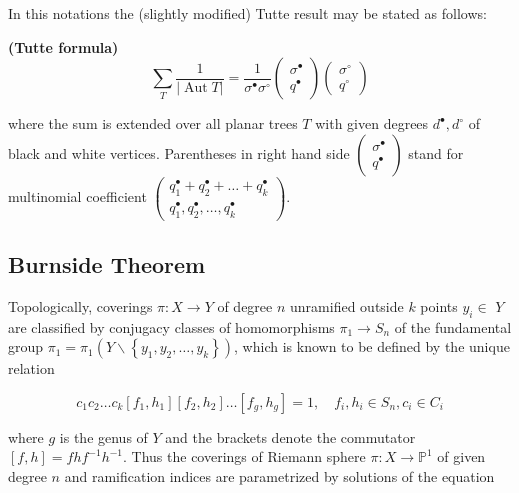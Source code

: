 In this notations the (slightly modified) Tutte result may be stated as follows:

\begin{thm}{\bf(Tutte formula)}
    $$
\sum_{T} \frac{1}{|\operatorname{Aut} T|}=\frac{1}{\sigma^{\bullet} \sigma^{\circ}}\left(\begin{array}{l}
\sigma^{\bullet}  \\
q^{\bullet}
\end{array}\right)\left(\begin{array}{l}
\sigma^{\circ} \\
q^{\circ}
\end{array}\right)
$$

where the sum is extended over all planar trees $T$ with given degrees $d^{\bullet}, d^{\circ}$ of black and white vertices. Parentheses in right hand side $\left(\begin{array}{c}\sigma^{\bullet} \\ q^{\bullet}\end{array}\right)$ stand for multinomial coefficient $\left(\begin{array}{c}q_{1}^{\bullet}+q_{2}^{\bullet}+\ldots+q_{k}^{\bullet} \\ q_{1}^{\bullet}, q_{2}^{\bullet}, \ldots, q_{k}^{\bullet}\end{array}\right)$.

\end{thm}


\subsection{Burnside Theorem}

Topologically, coverings $\pi: X \rightarrow Y$ of degree $n$ unramified outside $k$ points $y_{i} \in$ $Y$ are classified by conjugacy classes of homomorphisms $\pi_{1} \rightarrow S_{n}$ of the fundamental group $\pi_{1}=\pi_{1}\left(Y \backslash\left\{y_{1}, y_{2}, \ldots, y_{k}\right\}\right)$, which is known to be defined by the unique relation

$$
c_{1} c_{2} \ldots c_{k}\left[f_{1}, h_{1}\right]\left[f_{2}, h_{2}\right] \ldots\left[f_{g}, h_{g}\right]=1, \quad f_{i}, h_{i} \in S_{n}, c_{i} \in C_{i}
$$

where $g$ is the genus of $Y$ and the brackets denote the commutator $[f, h]=f h f^{-1} h^{-1}$. Thus the coverings of Riemann sphere $\pi: X \rightarrow \mathbb{P}^{1}$ of given degree $n$ and ramification indices are parametrized by solutions of the equation


